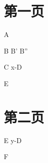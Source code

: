 \documentclass[twoside]{article}
\begin{document}
\tableofcontents

\section{第一页}
    A

    B
    B'
    B''

    C
    x-D
    

    E

\newpage

\section{第二页}
    E
    y-D

    F
\end{document}
